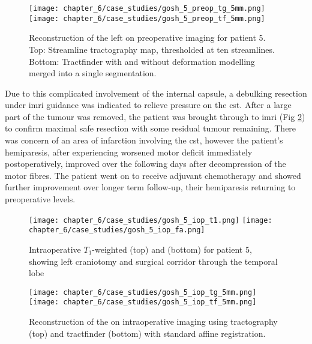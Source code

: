 \documentclass[12pt,phd,a4paper,twoside]{ucl_thesis}
\begin{document}
\begin{figure}[htb!]
  \centering
  \texttt{[image: chapter\_6/case\_studies/gosh\_5\_preop\_tg\_5mm.png]}
  \texttt{[image: chapter\_6/case\_studies/gosh\_5\_preop\_tf\_5mm.png]}
  \caption[GOSH iMRI patient 5, preoperative imaging, corticospinal tract reconstruction]{Reconstruction of the left  on preoperative imaging for patient 5. Top: Streamline tractography  map, thresholded at ten streamlines. Bottom: Tractfinder with and without deformation modelling merged into a single segmentation.}
  \label{fig:5p_cst}
\end{figure}

Due to this complicated involvement of the internal capsule, a debulking resection under \gls{imri} guidance was indicated to relieve pressure on the \gls{cst}.
After a large part of the tumour was removed, the patient was brought through to \gls{imri} (Fig \ref{fig:5i}) to confirm maximal safe resection with some residual tumour remaining.
There was concern of an area of infarction involving the \gls{cst}, however the patient's hemiparesis, after experiencing worsened motor deficit immediately postoperatively, improved over the following days after decompression of the motor fibres.
The patient went on to receive adjuvant chemotherapy and showed further improvement over longer term follow-up, their hemiparesis returning to preoperative levels.

\begin{figure}[htb!]
  \centering
  \texttt{[image: chapter\_6/case\_studies/gosh\_5\_iop\_t1.png]}
  \texttt{[image: chapter\_6/case\_studies/gosh\_5\_iop\_fa.png]}
  \caption[GOSH iMRI patient 5, intraoperative imaging]{Intraoperative $T_1$-weighted (top) and   (bottom) for patient 5, showing left craniotomy and surgical corridor through the temporal lobe}
  \label{fig:5i}
\end{figure}

\begin{figure}[htb!]
  \centering
  \texttt{[image: chapter\_6/case\_studies/gosh\_5\_iop\_tg\_5mm.png]}
  \texttt{[image: chapter\_6/case\_studies/gosh\_5\_iop\_tf\_5mm.png]}
  \caption[GOSH iMRI patient 5, intraoperative imaging, corticospinal tract reconstruction]{Reconstruction of the  on intraoperative imaging using tractography (top) and tractfinder (bottom) with standard affine registration.}
  \label{fig:5i_cst}
\end{figure}
\end{document}
